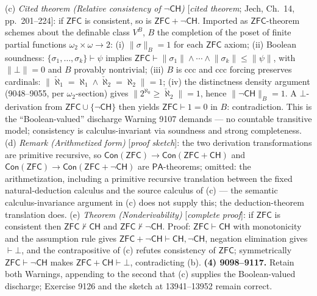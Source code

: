 (c) \emph{Cited theorem (Relative consistency of \(\neg\mathsf{CH}\))} [\emph{cited theorem}; Jech, Ch.~14, pp.~201--224]: if \(\mathsf{ZFC}\) is consistent, so is \(\mathsf{ZFC}+\neg\mathsf{CH}\).  Imported as \(\mathsf{ZFC}\)-theorem schemes about the definable class \(V^{B}\), \(B\) the completion of the poset of finite partial functions \(\omega_2\times\omega\to 2\): (i) \(\lVert\sigma\rVert_B=1\) for each \(\mathsf{ZFC}\) axiom; (ii) Boolean soundness: \(\{\sigma_1,\dots,\sigma_k\}\vdash\psi\) implies \(\mathsf{ZFC}\vdash\lVert\sigma_1\rVert\wedge\cdots\wedge\lVert\sigma_k\rVert\le\lVert\psi\rVert\), with \(\lVert\bot\rVert=0\) and \(B\) provably nontrivial; (iii) \(B\) is ccc and ccc forcing preserves cardinals: \(\lVert\check\aleph_1=\aleph_1\wedge\check\aleph_2=\aleph_2\rVert=1\); (iv) the distinctness density argument (9048--9055, per \(\omega_2\)-section) gives \(\lVert 2^{\aleph_0}\ge\check\aleph_2\rVert=1\), hence \(\lVert\neg\mathsf{CH}\rVert_B=1\).  A \(\bot\)-derivation from \(\mathsf{ZFC}\cup\{\neg\mathsf{CH}\}\) then yields \(\mathsf{ZFC}\vdash 1=0\) in \(B\): contradiction.  This is the ``Boolean-valued'' discharge Warning 9107 demands --- no countable transitive model; consistency is calculus-invariant via soundness and strong completeness.
(d) \emph{Remark (Arithmetized form)} [\emph{proof sketch}]: the two derivation transformations are primitive recursive, so \(\mathsf{Con}(\mathsf{ZFC})\to\mathsf{Con}(\mathsf{ZFC}+\mathsf{CH})\) and \(\mathsf{Con}(\mathsf{ZFC})\to\mathsf{Con}(\mathsf{ZFC}+\neg\mathsf{CH})\) are \(\mathsf{PA}\)-theorems; omitted: the arithmetization, including a primitive recursive translation between the fixed natural-deduction calculus and the source calculus of (c) --- the semantic calculus-invariance argument in (c) does not supply this; the deduction-theorem translation does.
(e) \emph{Theorem (Nonderivability)} [\emph{complete proof}]: if \(\mathsf{ZFC}\) is consistent then \(\mathsf{ZFC}\nvdash\mathsf{CH}\) and \(\mathsf{ZFC}\nvdash\neg\mathsf{CH}\).  Proof: \(\mathsf{ZFC}\vdash\mathsf{CH}\) with monotonicity and the assumption rule gives \(\mathsf{ZFC}+\neg\mathsf{CH}\vdash\mathsf{CH},\neg\mathsf{CH}\), negation elimination gives \(\vdash\bot\), and the contrapositive of (c) refutes consistency of \(\mathsf{ZFC}\); symmetrically \(\mathsf{ZFC}\vdash\neg\mathsf{CH}\) makes \(\mathsf{ZFC}+\mathsf{CH}\vdash\bot\), contradicting (b).
\textbf{(4) 9098--9117.}  Retain both Warnings, appending to the second that (c) supplies the Boolean-valued discharge; Exercise 9126 and the sketch at 13941--13952 remain correct.


